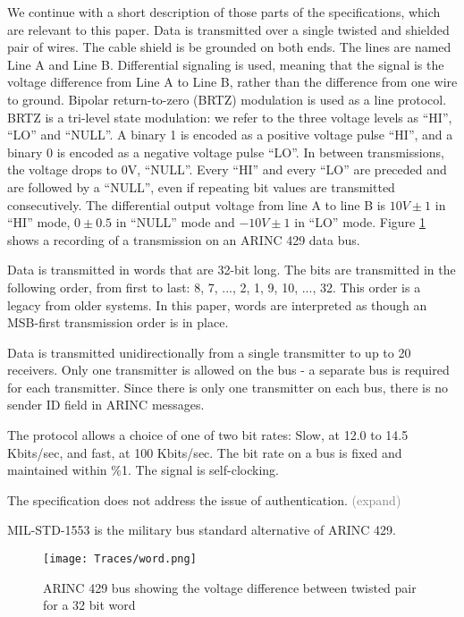\documentclass[conference]{IEEEtran}
\begin{document}
  We continue with a short description of those parts of the specifications, which are relevant to this paper. Data is transmitted over a single twisted and shielded pair of wires. The cable shield is be grounded on both ends. The lines are named Line A and Line B. Differential signaling is used, meaning that the signal is the voltage difference from Line A to Line B, rather than the difference from one wire to ground. Bipolar return-to-zero (BRTZ) modulation is used as a line protocol. BRTZ is a tri-level state modulation: we refer to the three voltage levels as ``HI'', ``LO'' and ``NULL''. A binary 1 is encoded as a positive voltage pulse ``HI'', and a binary 0 is encoded as a negative voltage pulse ``LO''. In between transmissions, the voltage drops to 0V, ``NULL''. Every ``HI'' and every ``LO'' are preceded and are followed by a ``NULL'', even if repeating bit values are transmitted consecutively. The differential output voltage from line A to line B is $10V \pm 1$ in ``HI'' mode, $0 \pm 0.5$ in ``NULL'' mode and $-10V \pm 1$ in ``LO'' mode.  Figure \ref{fig:word_example} shows a recording of a transmission on an ARINC 429 data bus.
  
  Data is transmitted in words that are 32-bit long. The bits are transmitted in the following order, from first to last: 8, 7, ..., 2, 1, 9, 10, ..., 32. This order is a legacy from older systems. In this paper, words are interpreted as though an MSB-first transmission order is in place.
  
  Data is transmitted unidirectionally from a single transmitter to up to 20 receivers. Only one transmitter is allowed on the bus - a separate bus is required for each transmitter. Since there is only one transmitter on each bus, there is no sender ID field in ARINC messages.
   
  The protocol allows a choice of one of two bit rates: Slow, at 12.0 to 14.5 Kbits/sec, and fast, at 100 Kbits/sec. The bit rate on a bus is fixed and maintained within \%1. The signal is self-clocking.
  
  The specification does not address the issue of authentication. \textcolor{gray}{(expand)}
   
  MIL-STD-1553 \cite{} is the military bus standard alternative of ARINC 429.
  
  \begin{figure}[t]
    \centering
    \texttt{[image: Traces/word.png]}
    \caption{ARINC 429 bus showing the voltage difference between twisted pair for a 32 bit word}
    \label{fig:word_example}
  \end{figure}
  
\end{document}
